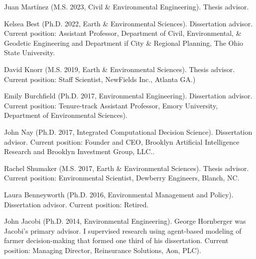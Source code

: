 \item Juan Mart\'inez (M.S. 2023, Civil \& Environmental Engineering).
  Thesis advisor.
\item Kelsea Best (Ph.D. 2022, Earth \& Environmental Sciences).
  Dissertation advisor.
  Current position: Assistant Professor, Department of Civil, Environmental, \& Geodetic
  Engineering and Department if City \& Regional Planning,
  The Ohio State University.
\item David Knorr (M.S. 2019, Earth \& Environmental Sciences).
  Thesis advisor.
  Current position: Staff Scientist, NewFields Inc., Atlanta GA.)
\item Emily Burchfield (Ph.D. 2017, Environmental Engineering).
  Dissertation advisor.
  Current position: Tenure-track Assistant Professor, Emory University, Department of Environmental Sciences).
\item John Nay (Ph.D. 2017, Integrated Computational Decision Science).
  Dissertation advisor.
  Current position: Founder and CEO, Brooklyn Artificial Intelligence Research and Brooklyn Investment Group, LLC..
\item Rachel Shumaker (M.S. 2017, Earth \& Environmental Sciences).
  Thesis advisor.
  Current position: Environmental Scientist, Dewberry Engineers, Blanch, NC.
\item Laura Benneyworth (Ph.D. 2016, Environmental Management and Policy).
  Dissertation advisor.
  Current position: Retired.
\item John Jacobi (Ph.D. 2014, Environmental Engineering).
  George Hornberger was Jacobi's primary advisor.
  I supervised research using agent-based modeling of farmer decision-making that formed one third of his dissertation.
  Current position: Managing Director, Reinsurance Solutions, Aon, PLC).
